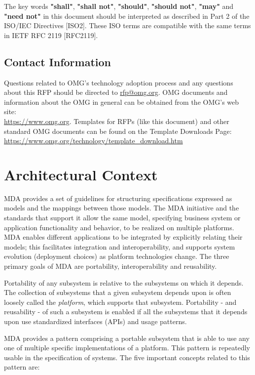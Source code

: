 The key words \textbf{"shall"}, \textbf{"shall not"}, \textbf{"should"}, \textbf{"should not"}, \textbf{"may"} and \textbf{"need not"} in this document should be interpreted as described in Part 2 of the ISO/IEC Directives [ISO2]. These ISO terms are compatible with the same terms in IETF RFC 2119 [RFC2119].

\subsection{Contact Information}

Questions related to OMG's technology adoption process and any questions about this RFP should be directed to \href{mailto:rfp@omg.org}{rfp@omg.org}.
OMG documents and information about the OMG in general can be obtained from the OMG's web site:\\ \url{https://www.omg.org}. Templates for RFPs (like this document) and other standard OMG documents can be found on the Template Downloads Page:\\ \url{https://www.omg.org/technology/template\_download.htm}



\section{Architectural Context}

MDA provides a set of guidelines for structuring specifications expressed as models and the mappings between those models. The MDA initiative and the standards that support it allow the same model, specifying business system or application functionality and behavior, to be realized on multiple platforms. MDA enables different applications to be integrated by explicitly relating their models; this facilitates integration and interoperability, and supports system evolution (deployment choices) as platform technologies change. The three primary goals of MDA are portability, interoperability and reusability.

Portability of any subsystem is relative to the subsystems on which it depends. The collection of subsystems that a given subsystem depends upon is often loosely called the \textit{platform}, which supports that subsystem. Portability - and reusability - of such a subsystem is enabled if all the subsystems that it depends upon use standardized interfaces (APIs) and usage patterns.

MDA provides a pattern comprising a portable subsystem that is able to use any one of multiple specific implementations of a platform. This pattern is repeatedly usable in the specification of systems. The five important concepts related to this pattern are:

